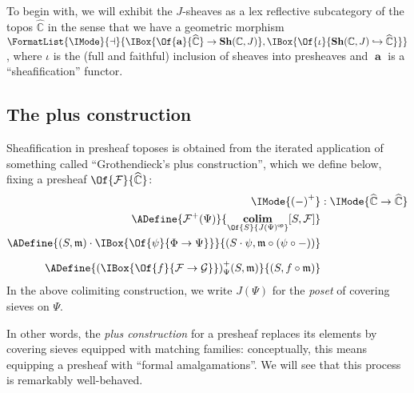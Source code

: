 \documentclass{article}
\DeclareMathOperator\Colim{\mathbf{colim}}
\newcommand\OpCat[1]{{{#1}^{\mathsf{op}}}}
\newcommand\Psh[1]{\widehat{#1}}
\newcommand\Sh[1]{\mathbf{Sh} (#1)}
\DeclareMathOperator{\Sheafify}{{\mathbf{a}}}
\newcommand\AreAdjoint[1]{\FormatList{\IMode}{\dashv}{#1}}
\newcommand\AOf[2]{\IMode{#1}&:\IMode{#2}}
\newcommand\Plus[1]{{#1}^+}
\begin{document}
To begin with, we will exhibit the $J$-sheaves as a lex reflective
subcategory of the topos $\Psh{\mathbb{C}}$ in the sense that we have
a geometric morphism
$\AreAdjoint{\IBox{\Of{\Sheafify}{\Psh{\mathbb{C}}}\to
    \Sh{\mathbb{C},J}},\IBox{\Of{\iota}{\Sh{\mathbb{C},J}\hookrightarrow\Psh{\mathbb{C}}}}}$,
where $\iota$ is the (full and faithful) inclusion of sheaves into
presheaves and $\Sheafify$ is a ``sheafification'' functor.

\subsection{The plus construction}

Sheafification in presheaf toposes is obtained from the iterated
application of something called ``Grothendieck's plus construction'',
which we define below, fixing a presheaf $\Of{\mathcal{F}}{\Psh{\mathbb{C}}}$:
\begin{align*}
  \AOf{
    \Plus{(-)}
  }{
  \Psh{\mathbb{C}}\to\Psh{\mathbb{C}}
  }
  \\
  \ADefine{
    \Plus{\mathcal{F}}(\Psi)
  }{
    \Colim_{\Of{S}{\OpCat{J(\Psi)}}}
    [S,\mathcal{F}]
  }
  \\
  \ADefine{
    (S,\mathfrak{m})\cdot\IBox{\Of{\psi}{\Phi\to\Psi}}
  }{
    (S\cdot\psi, \mathfrak{m}\circ (\psi\circ-))
  }
  \\[6pt]
  \ADefine{
    \Plus{(\IBox{\Of{f}{\mathcal{F}\to\mathcal{G}}})}_\Psi(S,\mathfrak{m})
  }{
    (S,f\circ\mathfrak{m})
  }
\end{align*}
In the above colimiting construction, we write $J(\Psi)$ for the
\emph{poset} of covering sieves on $\Psi$.

In other words, the \emph{plus construction} for a presheaf replaces
its elements by covering sieves equipped with matching families:
conceptually, this means equipping a presheaf with ``formal
amalgamations''. We will see that this process is remarkably
well-behaved.
\end{document}
